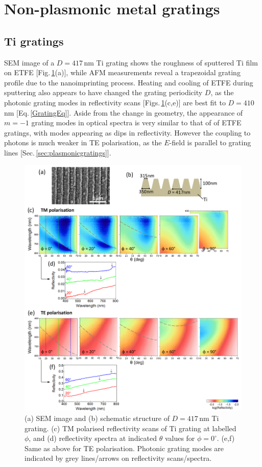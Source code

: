 \section{Non-plasmonic metal gratings}
\subsection{Ti gratings}
SEM image of a $D=417$\,nm Ti grating shows the roughness of sputtered Ti film on ETFE [Fig.\,\ref{7Fig4}(a)], while AFM measurements reveal a trapezoidal grating profile due to the nanoimprinting process. Heating and cooling of ETFE during sputtering also appears to have changed the grating periodicity $D$, as the photonic grating modes in reflectivity scans [Figs.\,\ref{7Fig4}(c,e)] are best fit to $D=410$\,nm [Eq.\,\ref{GratingEq}]. Aside from the change in geometry, the appearance of $m=-1$ grating modes in optical spectra is very similar to that of of ETFE gratings, with modes appearing as dips in reflectivity. However the coupling to photons is much weaker in TE polarisation, as the $E$-field is parallel to grating lines [Sec.\,\ref{sec:plasmonicgratings}].
\begin{figure}[h!] 
\centering    
\includegraphics[width=\textwidth]{Fig4}
\caption[(a) SEM image and (b) schematic structure of $D=417$\,nm Ti grating. Reflectivity measurements of Ti grating in (c,d) TM and (e.f) TE polarisation.]{(a) SEM image and (b) schematic structure of $D=417$\,nm Ti grating. (c) TM polarised reflectivity scans of Ti grating at labelled $\phi$, and (d) reflectivity spectra at indicated $\theta$ values for $\phi=0^{\circ}$. (e,f) Same as above for TE polarisation. Photonic grating modes are indicated by grey lines/arrows on reflectivity scans/spectra.}
\label{7Fig4}
\end{figure}

